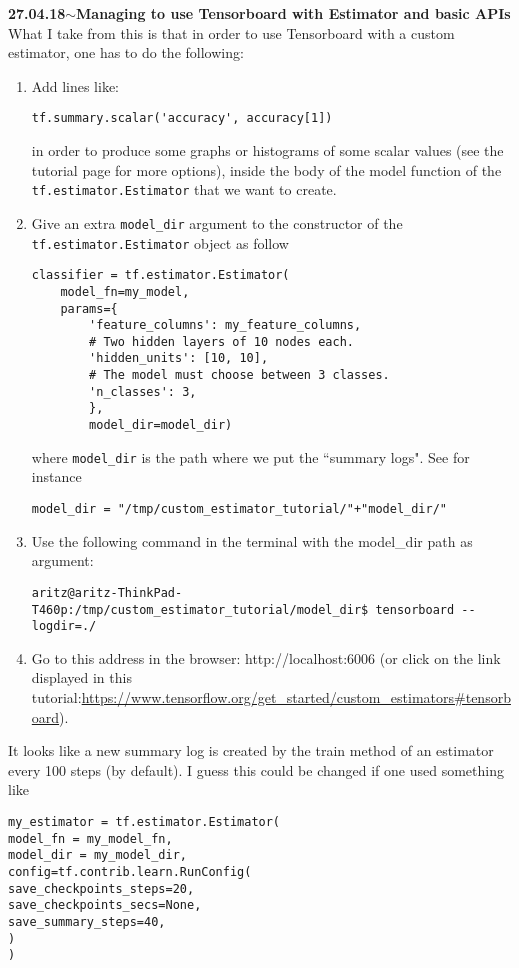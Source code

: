 \documentclass[11pt,a4paper]{article}
\newenvironment{loggentry}[2]%
{\noindent\textbf{#1}\hspace{1cm}$\mathbf{\sim}$\text{ }\textbf{#2}\\}{\vspace{0.5cm}}
\begin{document}
\begin{loggentry}{27.04.18}{Managing to use Tensorboard with Estimator and basic APIs}
What I take from this is that in order to use Tensorboard with a custom estimator, one has to do the following:
\begin{enumerate}
\item Add lines like:
\begin{verbatim}
tf.summary.scalar('accuracy', accuracy[1])
\end{verbatim}
in order to produce some graphs or histograms of some scalar values (see the tutorial page for more options), inside the body of the model function of the \texttt{tf.estimator.Estimator} that we want to create.
\item Give an extra \texttt{model\_dir} argument to the constructor of the \texttt{tf.estimator.Estimator} object as follow
\begin{verbatim}
classifier = tf.estimator.Estimator(
    model_fn=my_model,
    params={
        'feature_columns': my_feature_columns,
        # Two hidden layers of 10 nodes each.
        'hidden_units': [10, 10],
        # The model must choose between 3 classes.
        'n_classes': 3,
        },
        model_dir=model_dir)
\end{verbatim}
where \texttt{model\_dir} is the path where we put the ``summary logs". See for instance
\begin{verbatim}
model_dir = "/tmp/custom_estimator_tutorial/"+"model_dir/"
\end{verbatim}
\item Use the following command in the terminal with the model\_dir path as argument:
\begin{verbatim}
aritz@aritz-ThinkPad-T460p:/tmp/custom_estimator_tutorial/model_dir$ tensorboard --logdir=./
\end{verbatim}
\item Go to this address in the browser: http://localhost:6006 (or click on the link displayed in this tutorial:\url{https://www.tensorflow.org/get_started/custom_estimators#tensorboard}).
\end{enumerate}

It looks like a new summary log is created by the train method of an estimator every 100 steps (by default). I guess this could be changed if one used something like
\begin{verbatim}
my_estimator = tf.estimator.Estimator(
model_fn = my_model_fn,
model_dir = my_model_dir,
config=tf.contrib.learn.RunConfig(
save_checkpoints_steps=20,
save_checkpoints_secs=None,
save_summary_steps=40,
)
)
\end{verbatim}


\end{loggentry}
\end{document}
